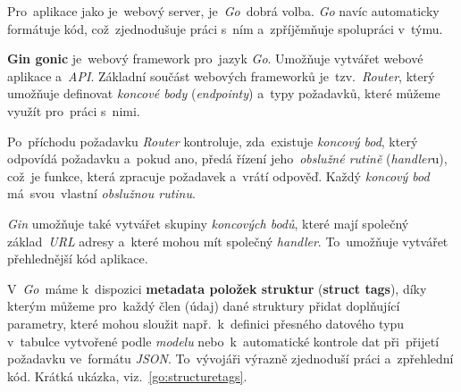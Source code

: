 \documentclass[11pt,a4paper]{report}
\begin{document}
            Pro~aplikace jako je~webový server, je~\emph{Go}~dobrá volba. \emph{Go} navíc automaticky formátuje kód, což~zjednodušuje práci s~ním a~zpříjěmňuje spolupráci v~týmu.

            \textbf{Gin gonic} je~webový framework pro~jazyk \emph{Go}. Umožňuje vytvářet webové aplikace a~\emph{API}. Základní součást webových frameworků je~tzv.~\emph{Router}, který umožňuje definovat \emph{koncové body} (\emph{endpointy}) a~typy požadavků, které můžeme využít pro~práci s~nimi.
            
            Po~příchodu požadavku \emph{Router} kontroluje, zda~existuje \emph{koncový bod}, který odpovídá požadavku a~pokud ano, předá řízení jeho~\emph{obslužné rutině} (\emph{handler}u), což~je funkce, která zpracuje požadavek a~vrátí odpověď. Každý \emph{koncový bod} má~svou~vlastní \emph{obslužnou rutinu}.
            
            \emph{Gin} umožňuje také vytvářet skupiny \emph{koncových bodů}, které mají společný základ~\emph{URL} adresy a~které mohou mít společný \emph{handler}. To~umožňuje vytvářet přehlednější kód aplikace.

            V~\emph{Go}~máme k~dispozici \textbf{metadata položek struktur} (\textbf{struct tags}), díky kterým můžeme pro~každý člen (údaj) dané struktury přidat doplňující parametry, které mohou sloužit např.~k~definici přesného datového typu v~tabulce vytvořené podle \emph{modelu} nebo~k~automatické kontrole dat při~přijetí požadavku ve~formátu \emph{JSON}. To~vývojáři výrazně zjednoduší práci a~zpřehlední kód. Krátká ukázka, viz.~\ref{go:structuretags}.
\end{document}
